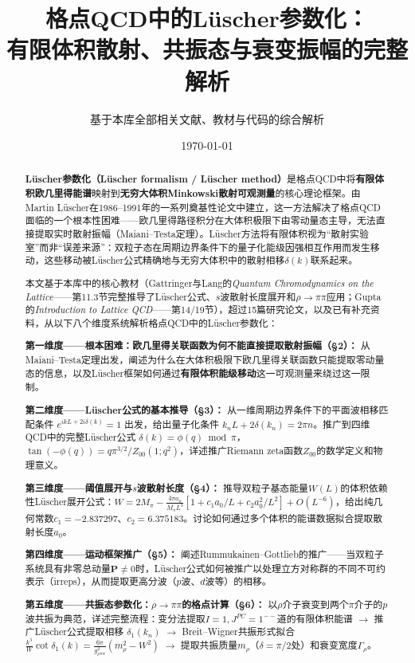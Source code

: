 \documentclass[12pt,a4paper]{ctexart}
\title{\heiti 格点QCD中的L\"uscher参数化：\\
有限体积散射、共振态与衰变振幅的完整解析}
\author{基于本库全部相关文献、教材与代码的综合解析}
\date{\today}
\theoremstyle{definition}
\begin{document}
\maketitle

\begin{abstract}
\noindent
\textbf{L\"uscher参数化（L\"uscher formalism / L\"uscher method）}是格点QCD中将\textbf{有限体积欧几里得能谱}映射到\textbf{无穷大体积Minkowski散射可观测量}的核心理论框架。由Martin L\"uscher在1986--1991年的一系列奠基性论文中建立，这一方法解决了格点QCD面临的一个根本性困难——欧几里得路径积分在大体积极限下由零动量态主导，无法直接提取实时散射振幅（Maiani--Testa定理）。L\"uscher方法将有限体积视为``散射实验室''而非``误差来源''：双粒子态在周期边界条件下的量子化能级因强相互作用而发生移动，这些移动被L\"uscher公式精确地与无穷大体积中的散射相移$\delta(k)$联系起来。

本文基于本库中的核心教材（Gattringer与Lang的\textit{Quantum Chromodynamics on the Lattice}——第11.3节完整推导了L\"uscher公式、$s$波散射长度展开和$\rho\to\pi\pi$应用；Gupta的\textit{Introduction to Lattice QCD}——第14/19节），超过15篇研究论文，以及已有补充资料，从以下八个维度系统解析格点QCD中的L\"uscher参数化：

\textbf{第一维度——根本困难：欧几里得关联函数为何不能直接提取散射振幅（§2）：}
从Maiani--Testa定理出发，阐述为什么在大体积极限下欧几里得关联函数只能提取零动量态的信息，以及L\"uscher框架如何通过\textbf{有限体积能级移动}这一可观测量来绕过这一限制。

\textbf{第二维度——L\"uscher公式的基本推导（§3）：}
从一维周期边界条件下的平面波相移匹配条件 $e^{ikL+2i\delta(k)} = 1$ 出发，给出量子化条件 $k_n L + 2\delta(k_n) = 2\pi n$。推广到四维QCD中的完整L\"uscher公式 $\delta(k) = \phi(q) \bmod \pi$，$\tan(-\phi(q)) = q\pi^{3/2}/Z_{00}(1;q^2)$，详述推广Riemann zeta函数$Z_{00}$的数学定义和物理意义。

\textbf{第三维度——阈值展开与$s$波散射长度（§4）：}
推导双粒子基态能量$W(L)$的体积依赖性L\"uscher展开公式：$W = 2M_\pi - \frac{4\pi a_0}{M_\pi L^3}[1 + c_1 a_0/L + c_2 a_0^2/L^2] + O(L^{-6})$，给出纯几何常数$c_1 = -2.837297$、$c_2 = 6.375183$。讨论如何通过多个体积的能谱数据拟合提取散射长度$a_0$。

\textbf{第四维度——运动框架推广（§5）：}
阐述Rummukainen--Gottlieb的推广——当双粒子系统具有非零总动量$\mathbf{P} \neq 0$时，L\"uscher公式如何被推广以处理立方对称群的不同不可约表示（irreps），从而提取更高分波（$p$波、$d$波等）的相移。

\textbf{第五维度——共振态参数化：$\rho\to\pi\pi$的格点计算（§6）：}
以$\rho$介子衰变到两个$\pi$介子的$p$波共振为典范，详述完整流程：变分法提取$I=1, J^{PC}=1^{--}$道的有限体积能谱 $\to$ 推广L\"uscher公式提取相移 $\delta_1(k_n)$ $\to$ Breit--Wigner共振形式拟合 $\frac{k^3}{W}\cot\delta_1(k) = \frac{6\pi}{g_{\rho\pi\pi}^2}(m_\rho^2 - W^2)$ $\to$ 提取共振质量$m_\rho$（$\delta=\pi/2$处）和衰变宽度$\Gamma_\rho$。


\end{abstract}
\end{document}
